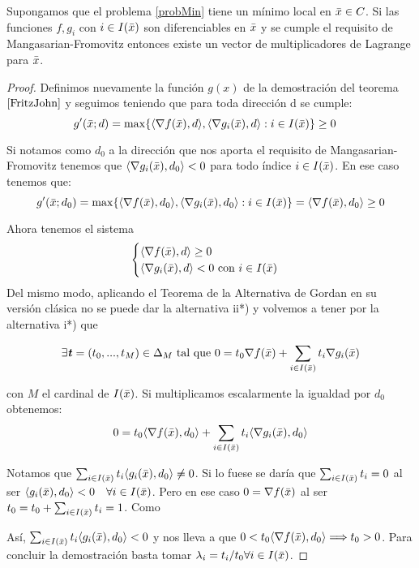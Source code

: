 		\begin{teoremaBox}
		Supongamos que el problema \ref{probMin} tiene un mínimo local en $ \bar{x} \in C $. Si las funciones $ f, g_i $ con $ i \in I(\bar{x}) $ son diferenciables en $ \bar{x} $ y se cumple el requisito de Mangasarian-Fromovitz entonces existe un vector de multiplicadores de Lagrange para $ \bar{x} $.
		\end{teoremaBox} 
	
		\begin{proof}
		Definimos nuevamente la función $ g(x) $ de la demostración del teorema $ \ref{FritzJohn} $ y seguimos teniendo que para toda dirección d se cumple:
		\[
		g'(\bar{x};d) = \max \{ \langle \nabla f(\bar{x}), d\rangle , \langle \nabla g_i(\bar{x}),d \rangle : i \in I(\bar{x})\} \geq 0 \quad
		\]
		
		Si notamos como $ d_0 $ a la dirección que nos aporta el requisito de Mangasarian-Fromovitz tenemos que $ \langle \nabla g_i(\bar{x}),d_0 \rangle < 0 $ para todo índice $ i \in I(\bar{x})$. En ese caso tenemos que:
		\[
		g'(\bar{x};d_0) = \max \{ \langle \nabla f(\bar{x}), d_0 \rangle , \langle \nabla g_i(\bar{x}),d_0 \rangle : i \in I(\bar{x})\} = \langle \nabla f(\bar{x}), d_0 \rangle \geq 0
		\]
		
		Ahora tenemos el sistema 
		\begin{equation*}
		\begin{cases}
		\langle \nabla f(\bar{x}), d\rangle  \geq 0 \\
		\langle \nabla g_i(\bar{x}),d \rangle < 0\text{ con } i \in I(\bar{x})
		\end{cases}
		\end{equation*}
		Del mismo modo, aplicando el Teorema de la Alternativa de Gordan en su versión clásica no se puede dar la alternativa ii*) y volvemos a tener por la alternativa i*) que 
		
		\[
		\exists \textbf{\emph{t}} = (t_0, ..., t_{M})\in \Delta_{M}  \text{ tal que }0 = t_0 \nabla f(\bar{x}) + \sum_{i \in I(\bar{x})}  t_i \nabla g_i (\bar{x})
		\]
		
		con $ M $ el cardinal de $ I(\bar{x}) $. Si multiplicamos escalarmente la igualdad por $ d_0 $ obtenemos:
		\[
		0 = t_0 \langle \nabla f(\bar{x}), d_0 \rangle + \sum_{i \in I(\bar{x})}  t_i \langle \nabla g_i (\bar{x}), d_0 \rangle
		\]
		
		Notamos que $ \sum_{i \in I(\bar{x})}  t_i \langle g_i (\bar{x}), d_0 \rangle \neq 0 $. Si lo fuese se daría que $ \sum_{i \in I(\bar{x})}  t_i = 0$ al ser $ \langle g_i (\bar{x}), d_0 \rangle < 0 \quad \forall i \in I(\bar{x})$. Pero en ese caso $ 0 = \nabla f(\bar{x}) $ al ser $ t_0 = t_0 + \sum_{i \in I(\bar{x})}  t_i = 1 $. Como 
		
		Así,  $ \sum_{i \in I(\bar{x})}  t_i \langle g_i (\bar{x}), d_0 \rangle < 0 $ y nos lleva a que $ 0 < t_0 \langle \nabla f(\bar{x}), d_0 \rangle \Longrightarrow t_0 > 0 $. Para concluir la demostración basta tomar $ \lambda_i = t_i / t_0  \forall i \in I(\bar{x})$.  
		
		\end{proof}
		